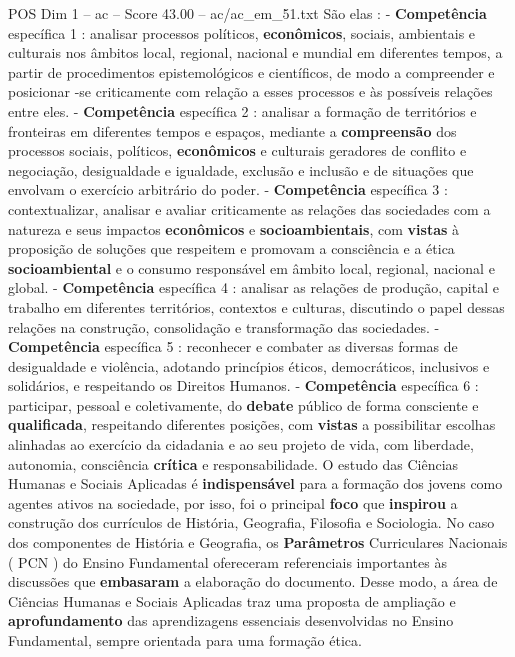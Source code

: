 \begin{textsample}{POS Dim 1 – ac – Score 43.00 – ac/ac\_em\_51.txt}
São elas : - \textbf{Competência} específica 1 : analisar processos políticos, \textbf{econômicos}, sociais, ambientais e culturais nos âmbitos local, regional, nacional e mundial em diferentes tempos, a partir de procedimentos epistemológicos e científicos, de modo a compreender e posicionar -se criticamente com relação a esses processos e às possíveis relações entre eles. - \textbf{Competência} específica 2 : analisar a formação de territórios e fronteiras em diferentes tempos e espaços, mediante a \textbf{compreensão} dos processos sociais, políticos, \textbf{econômicos} e culturais geradores de conflito e negociação, desigualdade e igualdade, exclusão e inclusão e de situações que envolvam o exercício arbitrário do poder. - \textbf{Competência} específica 3 : contextualizar, analisar e avaliar criticamente as relações das sociedades com a natureza e seus impactos \textbf{econômicos} e \textbf{socioambientais}, com \textbf{vistas} à proposição de soluções que respeitem e promovam a consciência e a ética \textbf{socioambiental} e o consumo responsável em âmbito local, regional, nacional e global. - \textbf{Competência} específica 4 : analisar as relações de produção, capital e trabalho em diferentes territórios, contextos e culturas, discutindo o papel dessas relações na construção, consolidação e transformação das sociedades. - \textbf{Competência} específica 5 : reconhecer e combater as diversas formas de desigualdade e violência, adotando princípios éticos, democráticos, inclusivos e solidários, e respeitando os Direitos Humanos. - \textbf{Competência} específica 6 : participar, pessoal e coletivamente, do \textbf{debate} público de forma consciente e \textbf{qualificada}, respeitando diferentes posições, com \textbf{vistas} a possibilitar escolhas alinhadas ao exercício da cidadania e ao seu projeto de vida, com liberdade, autonomia, consciência \textbf{crítica} e responsabilidade.
O estudo das Ciências Humanas e Sociais Aplicadas é \textbf{indispensável} para a formação dos jovens como agentes ativos na sociedade, por isso, foi o principal \textbf{foco} que \textbf{inspirou} a construção dos currículos de História, Geografia, Filosofia e Sociologia.
No caso dos componentes de História e Geografia, os \textbf{Parâmetros} Curriculares Nacionais ( PCN ) do Ensino Fundamental ofereceram referenciais importantes às discussões que \textbf{embasaram} a elaboração do documento.
Desse modo, a área de Ciências Humanas e Sociais Aplicadas traz uma proposta de ampliação e \textbf{aprofundamento} das aprendizagens essenciais desenvolvidas no Ensino Fundamental, sempre orientada para uma formação ética.

\end{textsample}

